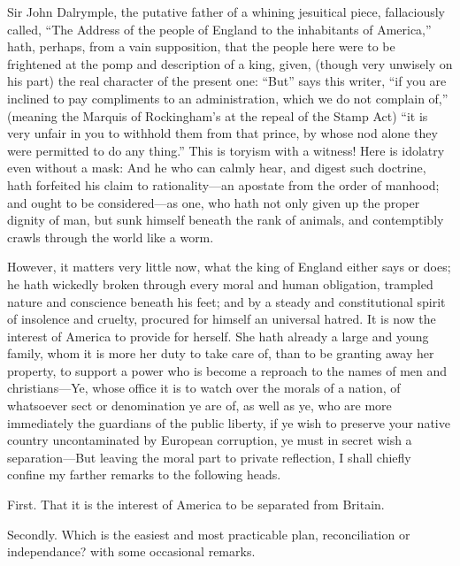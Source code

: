 \documentclass[12pt,oneside]{memoir}
\begin{document}
Sir John Dalrymple, the putative father of a whining jesuitical piece, fallaciously called, ``The Address of the people of England to the inhabitants of America,'' hath, perhaps, from a vain supposition, that the people here were to be frightened at the pomp and description of a king, given, (though very unwisely on his part) the real character of the present one: ``But'' says this writer, ``if you are inclined to pay compliments to an administration, which we do not complain of,'' (meaning the Marquis of Rockingham's at the repeal of the Stamp Act) ``it is very unfair in you to withhold them from that prince, by whose nod alone they were permitted to do any thing.'' This is toryism with a witness! Here is idolatry even without a mask: And he who can calmly hear, and digest such doctrine, hath forfeited his claim to rationality---an apostate from the order of manhood; and ought to be considered---as one, who hath not only given up the proper dignity of man, but sunk himself beneath the rank of animals, and contemptibly crawls through the world like a worm.

However, it matters very little now, what the king of England either says or does; he hath wickedly broken through every moral and human obligation, trampled nature and conscience beneath his feet; and by a steady and constitutional spirit of insolence and cruelty, procured for himself an universal hatred. It is now the interest of America to provide for herself. She hath already a large and young family, whom it is more her duty to take care of, than to be granting away her property, to support a power who is become a reproach to the names of men and christians---Ye, whose office it is to watch over the morals of a nation, of whatsoever sect or denomination ye are of, as well as ye, who are more immediately the guardians of the public liberty, if ye wish to preserve your native country uncontaminated by European corruption, ye must in secret wish a separation---But leaving the moral part to private reflection, I shall chiefly confine my farther remarks to the following heads.

First. That it is the interest of America to be separated from Britain.

Secondly. Which is the easiest and most practicable plan, reconciliation or independance? with some occasional remarks.
\end{document}
